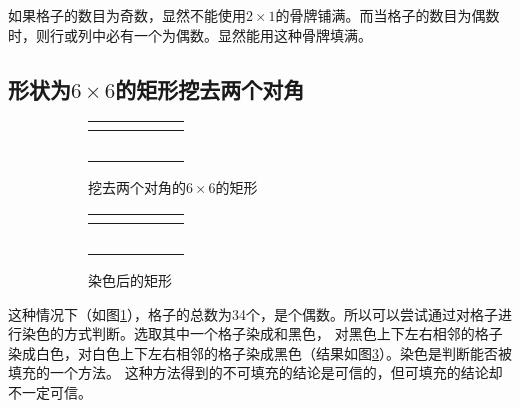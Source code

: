     如果格子的数目为奇数，显然不能使用$2\times1$的骨牌铺满。而当格子的数目为偶数时，则行或列中必有一个为偶数。显然能用这种骨牌填满。
\subsection{形状为$6\times6$的矩形挖去两个对角}\label{subsec:tiling-2-2}
    \begin{figure}[ht!]
        \begin{subfigure}{0.5\textwidth}
            \centering
            \begin{tabular}{|c|c|c|c|c|c|}
                \cline{2-6}
                \multicolumn{1}{c|}{}& & & & & \\ \hline
                & & & & & \\ \hline
                & & & & & \\ \hline
                & & & & & \\ \hline
                & & & & & \\ \hline
                & & & & &\multicolumn{1}{c}{} \\ 
                \cline{1-5}
            \end{tabular}
            \caption{挖去两个对角的$6\times6$的矩形}\label{fig:tiling-3}
        \end{subfigure}
        \begin{subfigure}{0.5\textwidth}
            \centering
            \begin{tabular}{|c|c|c|c|c|c|}
                \cline{2-6}
                \multicolumn{1}{c|}{}& \cellcolor[rgb]{0,0,0} & & \cellcolor[rgb]{0,0,0} & & \cellcolor[rgb]{0,0,0} \\ \hline
                 \cellcolor[rgb]{0,0,0} & & \cellcolor[rgb]{0,0,0} & & \cellcolor[rgb]{0,0,0} & \\ \hline
                 & \cellcolor[rgb]{0,0,0} & & \cellcolor[rgb]{0,0,0} & & \cellcolor[rgb]{0,0,0} \\ \hline
                 \cellcolor[rgb]{0,0,0} & & \cellcolor[rgb]{0,0,0} & & \cellcolor[rgb]{0,0,0} & \\ \hline
                 & \cellcolor[rgb]{0,0,0} & & \cellcolor[rgb]{0,0,0} & & \cellcolor[rgb]{0,0,0} \\ \hline
                 \cellcolor[rgb]{0,0,0} & & \cellcolor[rgb]{0,0,0} & & \cellcolor[rgb]{0,0,0} &\multicolumn{1}{c}{} \\ 
                \cline{1-5}
            \end{tabular}
            \caption{染色后的矩形}\label{fig:tiling-4}
        \end{subfigure}
        \caption{}
    \end{figure}
    这种情况下（如图\ref{fig:tiling-3}），格子的总数为34个，是个偶数。所以可以尝试通过对格子进行染色的方式判断。选取其中一个格子染成和黑色，
    对黑色上下左右相邻的格子染成白色，对白色上下左右相邻的格子染成黑色（结果如图\ref{fig:tiling-4}）。染色是判断能否被填充的一个方法。
    这种方法得到的不可填充的结论是可信的，但可填充的结论却不一定可信。

